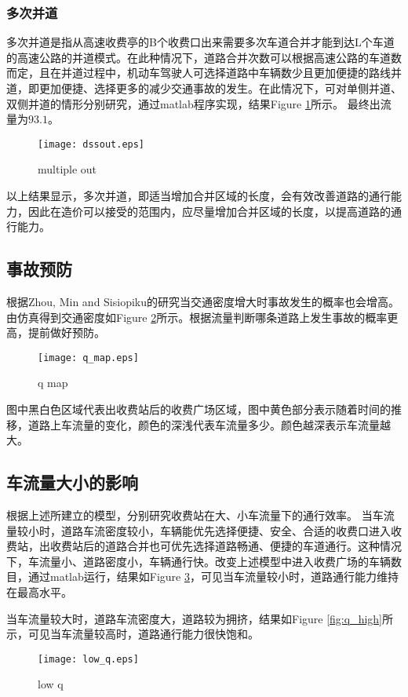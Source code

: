\documentclass{mcmthesis}
\begin{document}
\subsubsection{多次并道}
多次并道是指从高速收费亭的B个收费口出来需要多次车道合并才能到达L个车道的高速公路的并道模式。在此种情况下，道路合并次数可以根据高速公路的车道数而定，且在并道过程中，机动车驾驶人可选择道路中车辆数少且更加便捷的路线并道，即更加便捷、选择更多的减少交通事故的发生。在此情况下，可对单侧并道、双侧并道的情形分别研究，通过matlab程序实现，结果Figure \ref{fig:multiple_out}所示。
最终出流量为$93.1$。
\begin{figure}[!htbp]
	\small
	\centering
	\texttt{[image: dssout.eps]}
	\caption{\label{fig:multiple_out}multiple out} 
\end{figure}

以上结果显示，多次并道，即适当增加合并区域的长度，会有效改善道路的通行能力，因此在造价可以接受的范围内，应尽量增加合并区域的长度，以提高道路的通行能力。

\subsection{事故预防}
根据Zhou, Min and Sisiopiku的研究\cite{zhou1997relationship}当交通密度增大时事故发生的概率也会增高。由仿真得到交通密度如Figure \ref{fig:q_map}所示。根据流量判断哪条道路上发生事故的概率更高，提前做好预防。
\begin{figure}[!htbp]
	\small
	\centering
	\texttt{[image: q\_map.eps]}
	\caption{\label{fig:q_map}q map} 
\end{figure}

图中黑白色区域代表出收费站后的收费广场区域，图中黄色部分表示随着时间的推移，道路上车流量的变化，颜色的深浅代表车流量多少。颜色越深表示车流量越大。
\subsection{车流量大小的影响}

根据上述所建立的模型，分别研究收费站在大、小车流量下的通行效率。
当车流量较小时，道路车流密度较小，车辆能优先选择便捷、安全、合适的收费口进入收费站，出收费站后的道路合并也可优先选择道路畅通、便捷的车道通行。这种情况下，车流量小、道路密度小，车辆通行快。改变上述模型中进入收费广场的车辆数目，通过matlab运行，结果如Figure \ref{fig:q_low}，可见当车流量较小时，道路通行能力维持在最高水平。

当车流量较大时，道路车流密度大，道路较为拥挤，结果如Figure \ref{fig:q_high}所示，可见当车流量较高时，道路通行能力很快饱和。
\begin{figure}[!htbp]
	\small
	\centering
	\texttt{[image: low\_q.eps]}
	\caption{\label{fig:q_low}low q} 
\end{figure}
\end{document}
